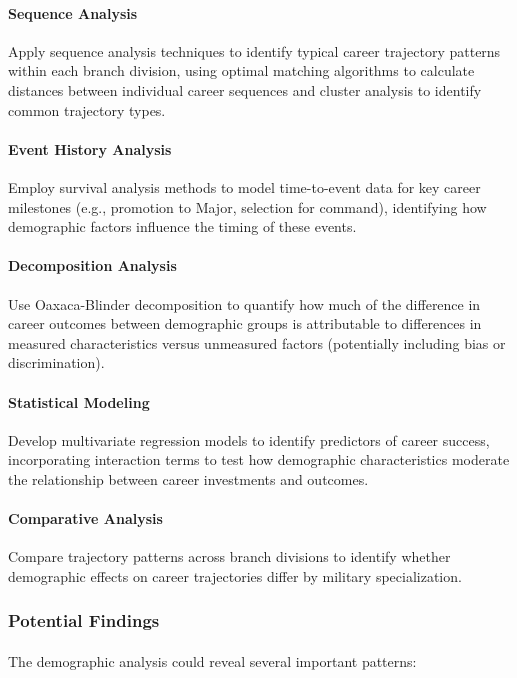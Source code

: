 \documentclass[../main.tex]{subfiles}
\begin{document}
\paragraph{Sequence Analysis} Apply sequence analysis techniques to identify typical career trajectory patterns within each branch division, using optimal matching algorithms to calculate distances between individual career sequences and cluster analysis to identify common trajectory types.

\paragraph{Event History Analysis} Employ survival analysis methods to model time-to-event data for key career milestones (e.g., promotion to Major, selection for command), identifying how demographic factors influence the timing of these events.

\paragraph{Decomposition Analysis} Use Oaxaca-Blinder decomposition to quantify how much of the difference in career outcomes between demographic groups is attributable to differences in measured characteristics versus unmeasured factors (potentially including bias or discrimination).

\paragraph{Statistical Modeling} Develop multivariate regression models to identify predictors of career success, incorporating interaction terms to test how demographic characteristics moderate the relationship between career investments and outcomes.

\paragraph{Comparative Analysis} Compare trajectory patterns across branch divisions to identify whether demographic effects on career trajectories differ by military specialization.

\subsubsection{Potential Findings}

\paragraph{} The demographic analysis could reveal several important patterns:
\end{document}
